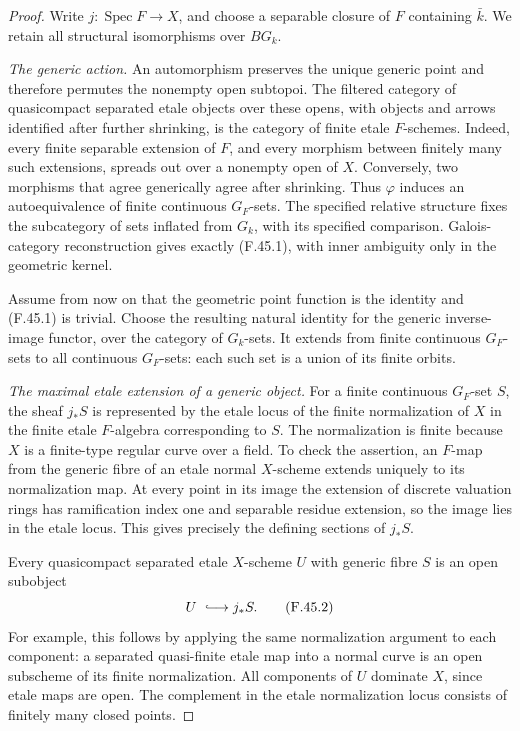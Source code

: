 \documentclass[11pt]{article}
\begin{document}
\begin{proof}
Write \(j:\operatorname{Spec}F\to X\), and choose a
separable closure of \(F\) containing \(\bar k\).
We retain all structural isomorphisms over \(BG_k\).

\emph{The generic action.}
An automorphism preserves the unique generic point and
therefore permutes the nonempty open subtopoi. The filtered
category of quasicompact separated etale objects over
these opens, with objects and arrows identified after
further shrinking, is the category of finite etale
\(F\)-schemes. Indeed, every finite separable extension
of \(F\), and every morphism between finitely many such
extensions, spreads out over a nonempty open of \(X\).
Conversely, two morphisms that agree generically agree
after shrinking. Thus \(\varphi\) induces an
autoequivalence of finite continuous \(G_F\)-sets.
The specified relative structure fixes the subcategory
of sets inflated from \(G_k\), with its specified
comparison. Galois-category reconstruction gives exactly
(F.45.1), with inner ambiguity only in the geometric
kernel.

Assume from now on that the geometric point function is
the identity and (F.45.1) is trivial. Choose the resulting
natural identity for the generic inverse-image functor,
over the category of \(G_k\)-sets. It extends from finite
continuous \(G_F\)-sets to all continuous \(G_F\)-sets:
each such set is a union of its finite orbits.

\emph{The maximal etale extension of a generic object.}
For a finite continuous \(G_F\)-set \(S\), the sheaf
\(j_*S\) is represented by the etale locus of the finite
normalization of \(X\) in the finite etale \(F\)-algebra
corresponding to \(S\). The normalization is finite
because \(X\) is a finite-type regular curve over a
field. To check the assertion, an \(F\)-map from the
generic fibre of an etale normal \(X\)-scheme extends
uniquely to its normalization map. At every point in its
image the extension of discrete valuation rings has
ramification index one and separable residue extension,
so the image lies in the etale locus. This gives precisely
the defining sections of \(j_*S\).

Every quasicompact separated etale \(X\)-scheme \(U\)
with generic fibre \(S\) is an open subobject
\[
                           U\ \lhook\joinrel\longrightarrow j_*S.
                                                        \tag{F.45.2}
\]
For example, this follows by applying the same
normalization argument to each component: a separated
quasi-finite etale map into a normal curve is an open
subscheme of its finite normalization. All components of
\(U\) dominate \(X\), since etale maps are open.
The complement in the etale normalization locus consists
of finitely many closed points.


\end{proof}
\end{document}
